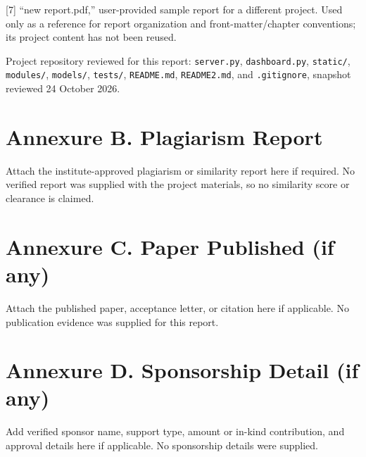 \documentclass[12pt,a4paper,oneside]{report}
\begin{document}
[7] ``new report.pdf,'' user-provided sample report for a different project. Used only as a reference for report organization and front-matter/chapter conventions; its project content has not been reused.\par\medskip
[8] Project repository reviewed for this report: \texttt{server.py}, \texttt{dashboard.py}, \texttt{static/}, \texttt{modules/}, \texttt{models/}, \texttt{tests/}, \texttt{README.md}, \texttt{README2.md}, and \texttt{.gitignore}, snapshot reviewed 24 October 2026.\par\medskip
\clearpage\chapter*{Annexure B. Plagiarism Report}
Attach the institute-approved plagiarism or similarity report here if required. No verified report was supplied with the project materials, so no similarity score or clearance is claimed.\par\medskip
\clearpage\chapter*{Annexure C. Paper Published (if any)}
Attach the published paper, acceptance letter, or citation here if applicable. No publication evidence was supplied for this report.\par\medskip
\clearpage\chapter*{Annexure D. Sponsorship Detail (if any)}
Add verified sponsor name, support type, amount or in-kind contribution, and approval details here if applicable. No sponsorship details were supplied.\par\medskip
\end{document}
